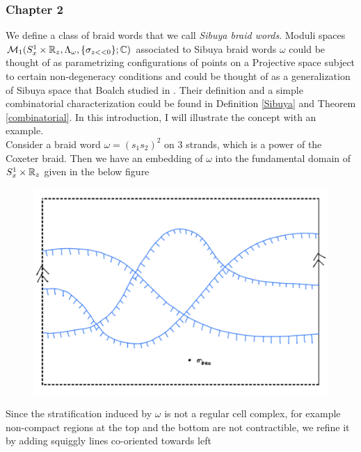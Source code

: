 \subsubsection*{Chapter 2}

We define a class of braid words that we call \emph{Sibuya braid words}. Moduli spaces $\mathcal{M}_1(S^1_x \times \mathbb{R}_z, \Lambda_\omega, \{\sigma_{z<<0}\};\mathbb{C})$ associated to Sibuya braid words $\omega$ could be thought of as parametrizing configurations of points on a Projective space subject to certain non-degeneracy conditions and could be thought of as a generalization of Sibuya space that Boalch studied in \cite{sibuya1975global}\cite{boalch2015wild}. Their definition and a simple combinatorial characterization could be found in  Definition \ref{Sibuya} and Theorem \ref{combinatorial}. In this introduction, I will illustrate the concept with an example.\\ 
Consider a braid word $\omega =(s_1 s_2)^2$ on $3$ strands, which is a power of the Coxeter braid. Then we have an embedding of $\omega$ into the fundamental domain of $S^1_x\times \mathbb{R}_z$ given in the below figure
\begin{figure}[H] 
    \centering
    \includegraphics[scale = 0.95]{diagrams/intro/7.png}
    \caption{}
    \label{fig:your-label}
\end{figure}
Since the stratification induced by $\omega$ is not a regular cell complex, for example non-compact regions at the top and the bottom are not contractible, we refine it by adding squiggly lines co-oriented towards left

